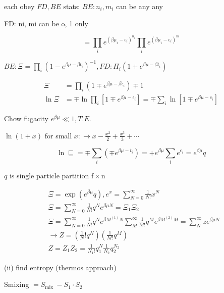 \documentclass[10pt]{article}
\begin{document}
each obey
$F D, B E$ stats: $B E: n_{i}, m_{i}$ can be any any

FD: ni, mi can be o, 1 only

$$
=\prod_{i} e^{\left(\beta \mu_{i}-\epsilon_{i}\right)^{n_{i}}} \prod_{i} e^{\left(\beta \mu_{i}-\epsilon_{i}\right)^{m}}
$$

$B E: \Xi=\prod_{i}\left(1-e^{\beta \mu-\beta t_{i}}\right)^{-1}, F D: \Pi_{i}\left(1+e^{\beta \mu-\beta t_{i}}\right)$

$$
\begin{aligned}
\Xi & =\prod_{i}\left(1 \mp e^{\beta \mu-\beta \epsilon_{i}}\right) \mp 1 \\
\ln \Xi & =\mp \ln \prod_{i}\left[1 \mp e^{\beta \mu-\epsilon_{i}}\right]=\mp \sum_{i} \ln \left[1 \mp e^{\beta \mu-c_{i}}\right]
\end{aligned}
$$

Chow fugacity $e^{\beta \mu} \ll 1, T . E$.

$\ln (1+x)$ for small $x: \longrightarrow x-\frac{x^{2}}{2}+\frac{x^{3}}{3}+\cdots$

$$
\ln \sqsubseteq=\mp \sum_{i}\left(\mp e^{\beta \mu-t_{i}}\right)=+e^{\beta \mu} \sum_{i} e^{\epsilon_{i}}=e^{\beta \mu} q
$$

$q$ is single particle partition $\mathrm{f} \times \mathrm{n}$

$$
\begin{aligned}
& \Xi=\exp \left(e^{\beta \mu} q\right), e^{x}=\sum_{N=0}^{\infty} \frac{1}{N !} x^{N} \\
& \Xi=\sum_{N=0}^{\infty} \frac{1}{N !} q^{N} e^{\beta \mu N}=\Xi_{1} \Xi_{2} \\
& \Xi=\sum_{N=0}^{\infty} \frac{1}{N !} q^{N} e^{\beta M^{(1)} N} \sum_{M}^{\infty} \frac{1}{M !} q^{M} e^{\beta M^{(2)} M}=\sum_{N}^{\infty} z e^{\beta \mu N} \\
& \rightarrow Z=\left(\frac{1}{N} ! q^{N}\right)\left(\frac{1}{M !} q^{M}\right) \\
& Z=Z_{1} Z_{2}=\frac{1}{N_{1} !} q_{1}^{N} \frac{1}{N_{2}} q_{2}^{N_{2}}
\end{aligned}
$$

(ii) find entropy (thermos approach)

Smixing $=S_{\text {mix }}-S_{1} \cdot S_{2}$
\end{document}

